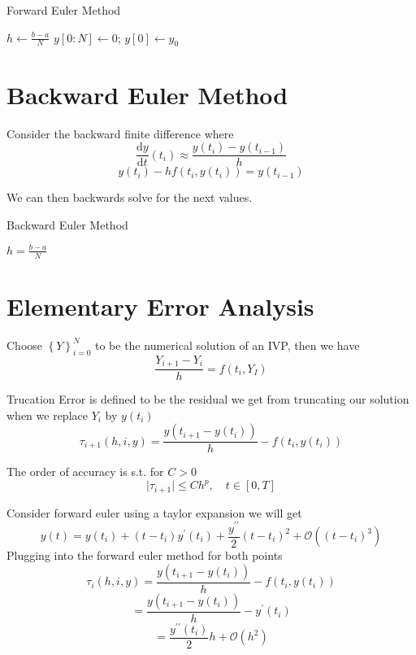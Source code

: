 \begin{algorithm}[H]
    \caption{Forward Euler Method}
    \BlankLine
    $h \gets \frac{b-a}{N}$\;
    $y[0:N] \gets 0$; $y[0] \gets y_0$\;
    \;
    \end{algorithm}

\section{Backward Euler Method}
\begin{definition}
    Consider the backward finite difference where
\[
    \frac{\mathrm{d}y}{\mathrm{d}t} (t_i) \approx \frac{y(t_i) - y(t_{i-1})}{h}
\]
\[
    y(t_i) - hf(t_i, y(t_i)) = y(t_{i-1} )
\]
\end{definition}
We can then backwards solve for the next values. 

\begin{algorithm}
    \caption{Backward Euler Method}
    \(h = \frac{b-a}{N}\)\;
    \;
\end{algorithm}

\section{Elementary Error Analysis}
Choose \(\left\{ Y \right\}_{i=0}^N \) to be the numerical solution of an IVP, then we have
\[
    \frac{Y_{i+1} - Y_i}{h} = f(t_i, Y_I)
\] 
\begin{definition}
    Trucation Error is defined to be the residual we get from truncating our solution when we replace \(Y_i\) by \(y(t_i)\) 
    \[
        \tau_{i+1}(h,i,y) = \frac{y(t_{i+1} - y(t_i))}{h} - f(t_i, y(t_i)) 
    \]
\end{definition}

\begin{definition}
    The order of accuracy is s.t. for \( C > 0\) 
    \[
        \vert \tau_{i+1}  \vert \leq C h^p, \quad t \in \left[ 0, T \right] 
    \]
\end{definition}
Consider forward euler using a taylor expansion we will get 
\[
    y(t) = y(t_i) + (t-t_i ) y^{\prime} (t_i) + 
    \frac{y^{\prime\prime} }{2} (t-t_i)^{2}  + \mathcal{O}  ((t-t_i)^{3} )
\]
Plugging into the forward euler method for both points 
\[
    \tau_i (h,i,y) = \frac{y(t_{i+1} - y(t_i) )}{h} - f(t_i, y(t_i))
\]
\[
    = \frac{y(t_{i+1} - y(t_i) )}{h} - y^{\prime} (t_i)
\]
\[
    = \frac{y^{\prime\prime} (t_i) }{2} h +  \mathcal{O}  (h^{2}  )
\]

